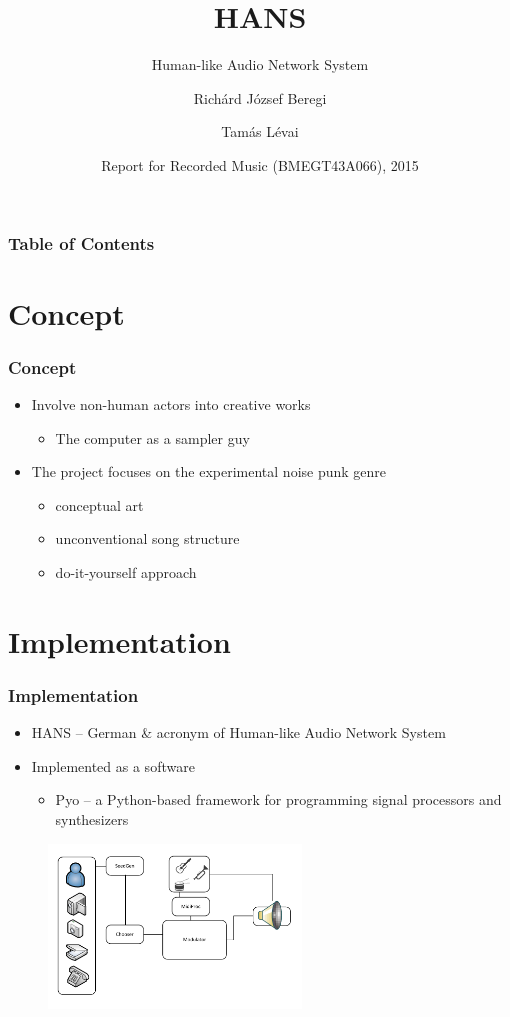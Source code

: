 \documentclass[mathserif,serif]{beamer}
\title[Crisis] %
{HANS}
\subtitle{Human-like Audio Network System}
\author[Beregi, Lévai] %
{Richárd József Beregi\inst{1} \and Tamás Lévai\inst{2}}
\institute[Budapest University of Technology and Economics] %
{
  \inst{1}%
  Faculty of Mechanical Engineering\\
  Budapest University of Technology and Economics
  \and
  \inst{2}%
  Faculty of Electrical Engineering and Informatics\\
  Budapest University of Technology and Economics
}
\date[RRM 2015] %
{Report for Recorded Music (BMEGT43A066), 2015}
\begin{document}
\frame{\titlepage}

\begin{frame}
\frametitle{Table of Contents}
\tableofcontents
\end{frame}

\section{Concept}
\begin{frame}
\frametitle{Concept}

\begin{itemize}
\item Involve non-human actors into creative works
\begin{itemize}
\item The computer as a sampler guy
\end{itemize}
\item The project focuses on the experimental noise punk genre
\begin{itemize}
\item conceptual art
\item unconventional song structure
\item do-it-yourself approach
\end{itemize}
\end{itemize}

\end{frame}

\section{Implementation}
\begin{frame}
\frametitle{Implementation}

\begin{itemize}
\item HANS -- German \& acronym of Human-like Audio Network System
\item Implemented as a software
\begin{itemize}
\item Pyo -- a Python-based framework for programming signal processors and synthesizers
\end{itemize}
\end{itemize}

\begin{figure}
       \centering
       \includegraphics[width=0.6\textwidth]{concept.pdf}
       \label{fig:hans}
\end{figure}


\end{frame}
\end{document}
